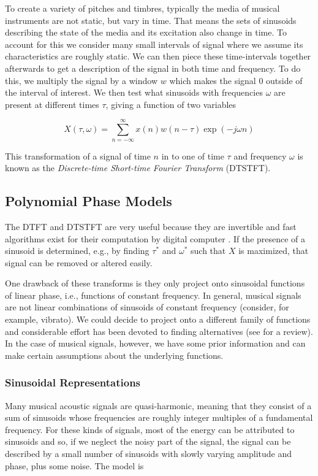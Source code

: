 \documentclass[letterpaper,12pt]{report}
\begin{document}
To create a variety of pitches and timbres, typically the media of musical
instruments are not static, but vary in time. That means the sets of sinusoids
describing the state of the media and its excitation also change in time. To
account for this we consider many small intervals of signal where we assume its
characteristics are roughly static. We can then piece these time-intervals
together afterwards to get a description of the signal in both time and
frequency. To do this, we multiply the signal by a window $w$ which makes the signal
0 outside of the interval of interest. We then test what sinusoids with
frequencies $\omega$ are present at different times $\tau$, giving a function of
two variables

\begin{equation}
    X(\tau,\omega) = \sum_{n=-\infty}^{\infty} x(n) w(n - \tau) \exp(-j \omega n)
\end{equation}

This transformation of a signal of time $n$ in to one of time $\tau$ and
frequency $\omega$ is known as the \textit{Discrete-time Short-time Fourier
Transform} (DTSTFT).

\subsection{Polynomial Phase Models}

The DTFT and DTSTFT are very useful because they are invertible
\cite{portnoff1976implementation} and fast algorithms exist for their 
computation by digital computer \cite{van1992computational}. If the presence of
a sinusoid is determined, e.g., by finding $\tau^{\ast}$ and $\omega^{\ast}$ such that
$X$ is maximized, that signal can be removed or altered easily.

One drawback of these transforms is they only project onto sinusoidal functions
of linear phase, i.e., functions of constant frequency. In general, musical
signals are not linear combinations of sinusoids of constant frequency
(consider, for example, vibrato). We could decide to project onto a different
family of functions and considerable effort has been devoted to finding
alternatives (see \cite{kereliuk2011sparse} for a review). In the case of
musical signals, however, we have some prior information and can make certain
assumptions about the underlying functions.

\subsubsection{Sinusoidal Representations}
\label{mq_fm_from_phase}
Many musical acoustic signals are quasi-harmonic, meaning that they consist of a
sum of sinusoids whose frequencies are roughly integer multiples of a
fundamental frequency. For these kinds of signals, most of the energy can be
attributed to sinusoids and so, if we neglect the noisy part of the signal, the
signal can be described by a small number of sinusoids with slowly varying
amplitude and phase, plus some noise. The model is
\end{document}
